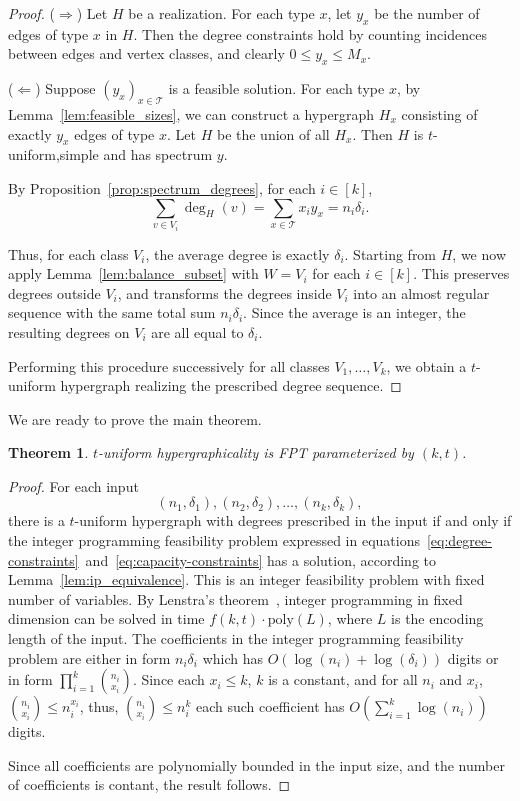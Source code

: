 \documentclass[pdflatex,sn-mathphys-num]{sn-jnl}%
\theoremstyle{thmstyleone}%
\newtheorem{theorem}{Theorem}%
\theoremstyle{thmstyletwo}%
\theoremstyle{thmstylethree}%
\begin{document}
\begin{proof}
($\Rightarrow$)
Let $H$ be a realization. For each type $x$, let $y_x$ be the number of edges of type $x$ in $H$. Then the degree constraints hold by counting incidences between edges and vertex classes, and clearly $0 \le y_x \le M_x$.

($\Leftarrow$)
Suppose $(y_x)_{x \in \mathcal{T}}$ is a feasible solution. For each type $x$, by Lemma~\ref{lem:feasible_sizes}, we can construct a hypergraph $H_x$ consisting of exactly $y_x$ edges of type $x$. Let $H$ be the union of all $H_x$. Then $H$ is $t$-uniform,simple and has spectrum $y$.

By Proposition~\ref{prop:spectrum_degrees}, for each $i \in [k]$,
\[
\sum_{v \in V_i} \deg_H(v) = \sum_{x \in \mathcal{T}} x_i y_x = n_i \delta_i.
\]

Thus, for each class $V_i$, the average degree is exactly $\delta_i$. Starting from $H$, we now apply Lemma~\ref{lem:balance_subset} with $W = V_i$ for each $i \in [k]$. This preserves degrees outside $V_i$, and transforms the degrees inside $V_i$ into an almost regular sequence with the same total sum $n_i \delta_i$. Since the average is an integer, the resulting degrees on $V_i$ are all equal to $\delta_i$.

Performing this procedure successively for all classes $V_1,\dots,V_k$, we obtain a $t$-uniform hypergraph realizing the prescribed degree sequence.
\end{proof}



We are ready to prove the main theorem.
\begin{theorem}
$t$-uniform hypergraphicality is FPT parameterized by $(k,t)$.
\end{theorem}

\begin{proof}
For each input 
$$
(n_1, \delta_1), (n_2,\delta_2),\ldots, (n_k,\delta_k),
$$
there is a $t$-uniform hypergraph with degrees prescribed in the input if and only if the integer programming feasibility problem expressed in equations~\ref{eq:degree-constraints}~and~\ref{eq:capacity-constraints} has a solution, according to Lemma~\ref{lem:ip_equivalence}. This is an integer feasibility problem with fixed number of variables.
By Lenstra's theorem~\cite{Lenstra}, integer programming in fixed dimension can be solved in time $f(k,t)\cdot \mathrm{poly}(L)$, where $L$ is the encoding length of the input.  The coefficients in the integer programming feasibility problem are either in form $n_i \delta_i$ which has $O(\log(n_i)+\log(\delta_i))$ digits or in form $\prod_{i=1}^k {n_i\choose x_i}$. Since each $x_i \le k$, $k$ is a constant, and for all $n_i$ and $x_i$, ${n_i\choose x_i} \le n_i^{x_i}$, thus, ${n_i\choose x_i} \le n_i^k$ each such coefficient has  $O\left(\sum_{i=1}^k \log(n_i)\right)$ digits.


Since all coefficients are polynomially bounded in the input size, and the number of coefficients is contant, the result follows.
\end{proof}
\end{document}
